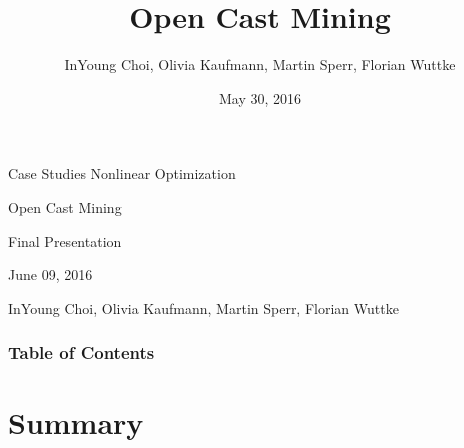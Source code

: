 \documentclass{beamer}
\title[Kurzform]{Open Cast Mining}
\author{InYoung Choi, Olivia Kaufmann, Martin Sperr, Florian Wuttke}
\date{May 30, 2016}
\begin{document}

\begin{frame}[c]
	\begin{center}
		\large{Case Studies Nonlinear Optimization}
	\end{center}
	\vspace{0.5cm}
	\begin{center}
		\Huge{\textcolor{TUMblau2}{Open Cast Mining}}
	\end{center}
	\begin{center}
		\large{Final Presentation}
	\end{center}
	\vspace{0.5cm}
	\begin{center}
		June 09, 2016
	\end{center}
	\vspace{0.5cm}
	\begin{center}
		\small{InYoung Choi, Olivia Kaufmann, Martin Sperr, Florian Wuttke}
	\end{center}
\end{frame}

\begin{frame}[c]
	\frametitle{Table of Contents}
	\tableofcontents
\end{frame}





%




\section{Summary}
\end{document}
